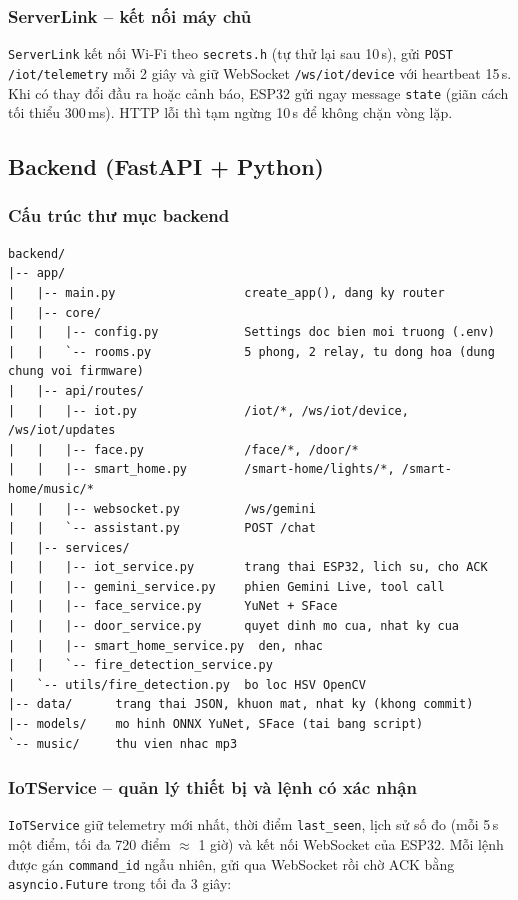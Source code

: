 \documentclass[12pt,a4paper]{extarticle}
\begin{document}
\subsubsection{ServerLink -- kết nối máy chủ}
\texttt{ServerLink} kết nối Wi-Fi theo \texttt{secrets.h} (tự thử lại sau 10\,s), gửi \texttt{POST /iot/telemetry} mỗi 2 giây và giữ WebSocket \texttt{/ws/iot/device} với heartbeat 15\,s. Khi có thay đổi đầu ra hoặc cảnh báo, ESP32 gửi ngay message \texttt{state} (giãn cách tối thiểu 300\,ms). HTTP lỗi thì tạm ngừng 10\,s để không chặn vòng lặp.

\subsection{Backend (FastAPI + Python)}
\subsubsection{Cấu trúc thư mục backend}
\begin{lstlisting}[language={}]
backend/
|-- app/
|   |-- main.py                  create_app(), dang ky router
|   |-- core/
|   |   |-- config.py            Settings doc bien moi truong (.env)
|   |   `-- rooms.py             5 phong, 2 relay, tu dong hoa (dung chung voi firmware)
|   |-- api/routes/
|   |   |-- iot.py               /iot/*, /ws/iot/device, /ws/iot/updates
|   |   |-- face.py              /face/*, /door/*
|   |   |-- smart_home.py        /smart-home/lights/*, /smart-home/music/*
|   |   |-- websocket.py         /ws/gemini
|   |   `-- assistant.py         POST /chat
|   |-- services/
|   |   |-- iot_service.py       trang thai ESP32, lich su, cho ACK
|   |   |-- gemini_service.py    phien Gemini Live, tool call
|   |   |-- face_service.py      YuNet + SFace
|   |   |-- door_service.py      quyet dinh mo cua, nhat ky cua
|   |   |-- smart_home_service.py  den, nhac
|   |   `-- fire_detection_service.py
|   `-- utils/fire_detection.py  bo loc HSV OpenCV
|-- data/      trang thai JSON, khuon mat, nhat ky (khong commit)
|-- models/    mo hinh ONNX YuNet, SFace (tai bang script)
`-- music/     thu vien nhac mp3
\end{lstlisting}

\subsubsection{IoTService -- quản lý thiết bị và lệnh có xác nhận}
\texttt{IoTService} giữ telemetry mới nhất, thời điểm \texttt{last\_seen}, lịch sử số đo (mỗi 5\,s một điểm, tối đa 720 điểm $\approx$ 1 giờ) và kết nối WebSocket của ESP32. Mỗi lệnh được gán \texttt{command\_id} ngẫu nhiên, gửi qua WebSocket rồi chờ ACK bằng \texttt{asyncio.Future} trong tối đa 3 giây:
\end{document}
